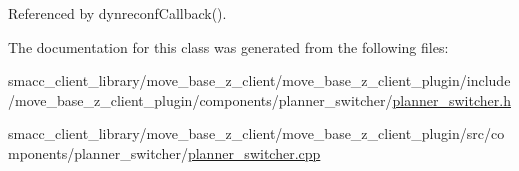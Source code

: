 Referenced by dynreconf\+Callback().



The documentation for this class was generated from the following files\+:\begin{DoxyCompactItemize}
\item 
smacc\+\_\+client\+\_\+library/move\+\_\+base\+\_\+z\+\_\+client/move\+\_\+base\+\_\+z\+\_\+client\+\_\+plugin/include/move\+\_\+base\+\_\+z\+\_\+client\+\_\+plugin/components/planner\+\_\+switcher/\hyperlink{planner__switcher_8h}{planner\+\_\+switcher.\+h}\item 
smacc\+\_\+client\+\_\+library/move\+\_\+base\+\_\+z\+\_\+client/move\+\_\+base\+\_\+z\+\_\+client\+\_\+plugin/src/components/planner\+\_\+switcher/\hyperlink{planner__switcher_8cpp}{planner\+\_\+switcher.\+cpp}\end{DoxyCompactItemize}
